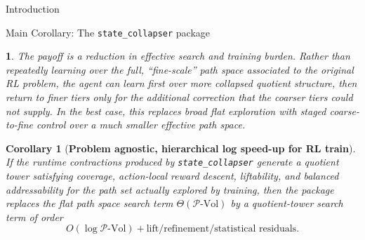 \documentclass[11pt]{article}
\newtheorem{ermark}[subsubsection]{}
\newtheorem{corollary}[subsubsection]{Corollary}
\newcommand{\PVol}{\mathcal{P}\text{-}\mathrm{Vol}}
\begin{document}
\begin{section}{Introduction}
\begin{subsection}{Main Corollary: The \texttt{state\_collapser} package}
\begin{ermark}
The payoff is a reduction in effective search and training burden. Rather than repeatedly learning over the full, ``fine-scale'' path space associated to the original RL problem, the agent can learn first over more collapsed quotient structure, then return to finer tiers only for the additional correction that the coarser tiers could not supply. In the best case, this replaces broad flat exploration with staged coarse-to-fine control over a much smaller effective path space.
\end{ermark}

\begin{corollary}[{\bf Problem agnostic, hierarchical log speed-up for RL train}]\label{cor:state-collapser}
If the runtime contractions produced by \texttt{state\_collapser} generate a quotient tower satisfying coverage, action-local reward descent, liftability, and balanced addressability for the path set actually explored by training, then the package replaces the flat path space search term $\Theta(\PVol)$ by a quotient-tower search term of order
\[
    O(\log \PVol)+\text{lift/refinement/statistical residuals}.
\]
\end{corollary}

\end{subsection}

\end{section}
\end{document}
